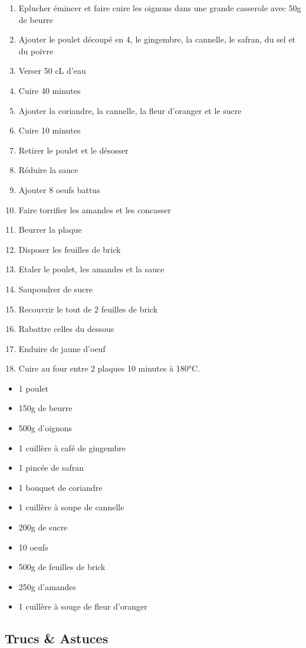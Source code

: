     \begin{minipage}{.7\textwidth}
        \begin{enumerate}
            \item Eplucher émincer et faire cuire les oignons dans une grande casserole avec 50g de beurre
	    \item Ajouter le poulet découpé en 4, le gingembre, la cannelle, le safran, du sel et du poivre
	    \item Verser 50 cL d'eau
	    \item Cuire 40 minutes
	    \item Ajouter la coriandre, la cannelle, la fleur d'oranger et le sucre
	    \item Cuire 10 minutes
	    \item Retirer le poulet et le désosser
	    \item Réduire la sauce
	    \item Ajouter 8 oeufs battus
	    \item Faire torrifier les amandes et les concasser
	    \item Beurrer la plaque
	    \item Disposer les feuilles de brick
	    \item Etaler le poulet, les amandes et la sauce
	    \item Saupoudrer de sucre
	    \item Recouvrir le tout de 2 feuilles de brick
	    \item Rabattre celles du dessous
	    \item Enduire de jaune d'oeuf
	    \item Cuire au four entre 2 plaques 10 minutes à 180°C.

        \end{enumerate}
    \end{minipage}
    \begin{minipage}{.3\textwidth}
        \begin{flushleft}
        \begin{itemize}
            \item 1 poulet
	    \item 150g de beurre
	    \item 500g d'oignons
	    \item 1 cuillère à café de gingembre
	    \item 1 pincée de safran
	    \item 1 bouquet de coriandre
	    \item 1 cuillère à soupe de cannelle
	    \item 200g de sucre
	    \item 10 oeufs
	    \item 500g de feuilles de brick
	    \item 250g d'amandes
	    \item 1 cuillère à souge de fleur d'oranger

        \end{itemize}
        \end{flushleft}
    \end{minipage}
    
    \vspace{1cm}
    \hline
    \vspace{1cm}
    
    \subsection{Trucs \& Astuces}
        

